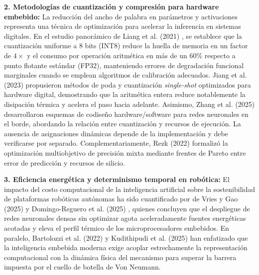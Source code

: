 \documentclass[12pt]{article}
\begin{document}
\textbf{2. Metodologías de cuantización y compresión para hardware embebido:} 
La reducción del ancho de palabra en parámetros y activaciones representa una técnica de optimización para acelerar la inferencia en sistemas digitales. En el estudio panorámico de Liang et al. (2021) \cite{Liang2021PruningSurvey}, se establece que la cuantización uniforme a 8 bits (INT8) reduce la huella de memoria en un factor de $4\times$ y el consumo por operación aritmética en más de un $60\%$ respecto a punto flotante estándar (FP32), manteniendo errores de degradación funcional marginales cuando se emplean algoritmos de calibración adecuados. Jiang et al. (2023) \cite{Jiang2023SingleShot} propusieron métodos de poda y cuantización \textit{single-shot} optimizados para hardware digital, demostrando que la aritmética entera reduce notablemente la disipación térmica y acelera el paso hacia adelante. Asimismo, Zhang et al. (2025) \cite{Zhang2025jlpea} desarrollaron esquemas de codiseño hardware/software para redes neuronales en el borde, abordando la relación entre cuantización y recursos de ejecución. La ausencia de asignaciones dinámicas depende de la implementación y debe verificarse por separado. Complementariamente, Rezk (2022) \cite{Rezk2022MOHAQ} formalizó la optimización multiobjetivo de precisión mixta mediante frentes de Pareto entre error de predicción y recursos de silicio.

\textbf{3. Eficiencia energética y determinismo temporal en robótica:} 
El impacto del costo computacional de la inteligencia artificial sobre la sostenibilidad de plataformas robóticas autónomas ha sido cuantificado por de Vries y Gao (2025) \cite{deVriesGao2025AIenergy} y Domingo-Reguero et al. (2025) \cite{DomingoReguero2025EnergyEfficient}, quienes concluyen que el despliegue de redes neuronales densas sin optimizar agota aceleradamente fuentes energéticas acotadas y eleva el perfil térmico de los microprocesadores embebidos. En paralelo, Bartolozzi et al. (2022) \cite{Bartolozzi2022embodied} y Kudithipudi et al. (2025) \cite{Kudithipudi2025scale} han enfatizado que la inteligencia embebida moderna exige acoplar estrechamente la representación computacional con la dinámica física del mecanismo para superar la barrera impuesta por el cuello de botella de Von Neumann.
\end{document}
